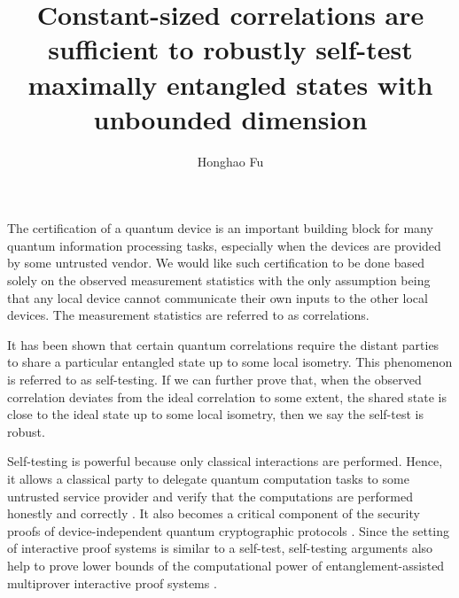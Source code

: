\documentclass[11pt,letterpaper]{article}
\date{}
\newcommand{\1}{\mathbb{1}}
\theoremstyle{definition}
\begin{document}
\title{Constant-sized correlations are sufficient to robustly self-test maximally entangled states with unbounded dimension}

\author{Honghao Fu}

\maketitle

The certification of a quantum device is an important building block
for many quantum information processing tasks, especially
when the devices are provided by some untrusted vendor.
We would like such certification to be done based solely on
the observed measurement statistics with the only assumption being that
any local device cannot communicate their own
inputs to the other local devices. 
The measurement statistics are referred to as correlations.

It has been shown that certain quantum correlations require the distant parties to share
a particular entangled state up to some local isometry. 
This phenomenon is referred to as self-testing.  
If we can further prove that, when the observed correlation deviates from 
the ideal correlation to some extent, 
the shared state is close to the ideal state up to some local isometry,
then we say the self-test is robust. 

Self-testing is powerful because only classical interactions are performed.
Hence, it allows a classical party to delegate quantum computation tasks to some untrusted service provider
and verify that the computations are performed
honestly and correctly \cite{ruv2013,coladan2017verifier}.
It also becomes a critical component of the security proofs of device-independent quantum cryptographic protocols
\cite{mayersyao,vv2014,miller2017,fu2018,eat2018}.
Since the setting of interactive proof systems is similar to a self-test, self-testing arguments also help to prove
lower bounds of the computational power of entanglement-assisted
multiprover interactive proof systems \cite{fitzsimons2019, neexp}.
\end{document}
